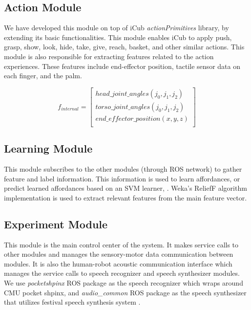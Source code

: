 \documentclass[runningheads,a4paper]{llncs}
\begin{document}
\subsection{Action Module}

We have developed this module on top of iCub \emph{actionPrimitives} library, by extending its basic functionalities. This module enables iCub to apply push, grasp, show, look, hide, take, give, reach, basket, and other similar actions. This module is also responsible for extracting features related to the action experiences. These features include end-effector position, tactile sensor data on each finger, and the palm.

\[
f_{internal} =
\left[ {\begin{array}{cc}
head\_joint\_angles (j_0, j_1, j_2)\\
torso\_joint\_angles (j_0, j_1, j_2)\\
end\_effector\_position (x,y,z)\\
\end{array} } \right]
\]	

\subsection{Learning Module}

This module subscribes to the other modules (through ROS network) to gather feature and label information. This information is used to learn affordances, or predict learned affordances based on an SVM learner, \cite{svm}. Weka's \cite{weka} ReliefF algorithm implementation is used to extract relevant features from the main feature vector.

\subsection{Experiment Module}

This module is the main control center of the system. It makes service calls to other modules and manages the sensory-motor data communication between modules. It is also the human-robot acoustic communication interface which manages the service calls to speech recognizer and speech synthesizer modules. We use \emph{pocketshpinx} ROS package as the speech recognizer which wraps around CMU pocket shpinx\cite{sphinx}, and \emph{audio\_common} ROS package as the speech synthesizer that utilizes festival speech synthesis system \cite{festival}.
\end{document}
